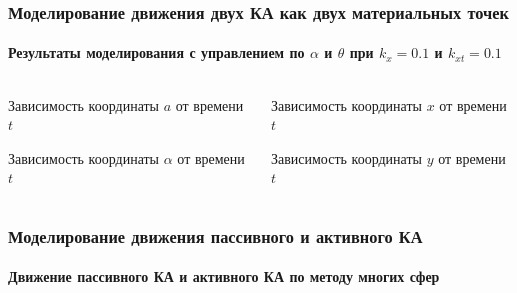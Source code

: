 \documentclass[10pt,pdf,hyperref={unicode}]{beamer}
\begin{document}
\begin{frame}
\frametitle{Моделирование движения двух КА как двух материальных точек}
\framesubtitle{Результаты моделирования с управлением по $\alpha$ и $\theta$ при $k_x = 0.1$ и $k_{x t} = 0.1$}
\begin{columns}[onlytextwidth]
	\begin{column}{0.5\textwidth}
		\begin{figure}[H]
		\end{figure}
		\scriptsize{Зависимость координаты $a$ от времени $t$}
		\begin{figure}[H]
		\end{figure} 
		\scriptsize{Зависимость координаты $\alpha$ от времени $t$}
	\end{column}
	\begin{column}{0.5\textwidth}
		\begin{figure}[H]
		\end{figure} 
		\scriptsize{Зависимость координаты $x$ от времени $t$}
		\begin{figure}[H]
		\end{figure} 
		\scriptsize{Зависимость координаты $y$ от времени $t$}
	\end{column}
\end{columns}
\end{frame}

\begin{frame}
\frametitle{Моделирование движения пассивного и активного КА}
\framesubtitle{Движение пассивного КА и активного КА по методу многих сфер}
	\begin{figure}[H]
	\end{figure}
\end{frame}
\end{document}
